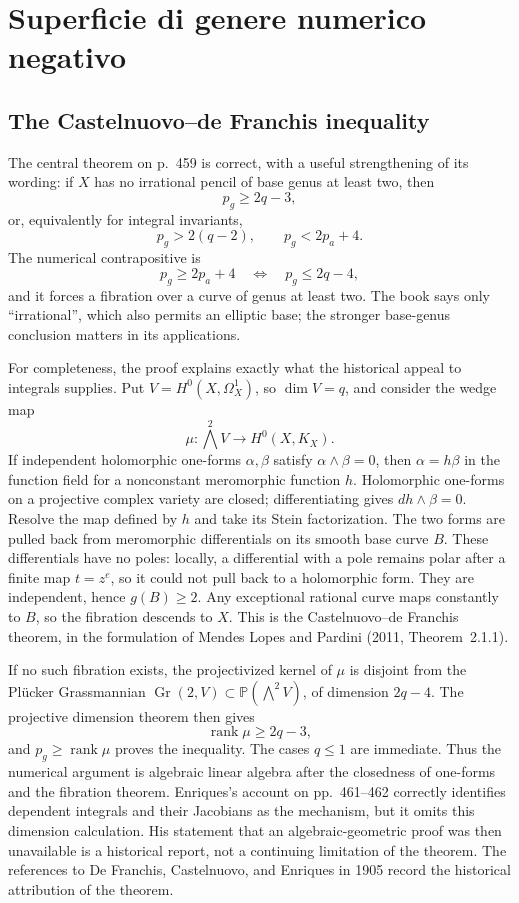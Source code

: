 \section{Superficie di genere numerico negativo}
\label{cp2-xi-8}

\subsection{The Castelnuovo--de Franchis inequality}

The central theorem on p.~459 is correct, with a useful strengthening of its wording: if \(X\) has no irrational pencil of base genus at least two, then
\[
p_g\ge2q-3,
\]
or, equivalently for integral invariants,
\[
p_g>2(q-2),\qquad p_g<2p_a+4.
\]
The numerical contrapositive is
\[
p_g\ge2p_a+4\quad\Longleftrightarrow\quad p_g\le2q-4,
\]
and it forces a fibration over a curve of genus at least two. The book says only ``irrational'', which also permits an elliptic base; the stronger base-genus conclusion matters in its applications.

For completeness, the proof explains exactly what the historical appeal to integrals supplies. Put \(V=H^0(X,\Omega_X^1)\), so \(\dim V=q\), and consider the wedge map
\[
\mu:\bigwedge^2V\longrightarrow H^0(X,K_X).
\]
If independent holomorphic one-forms \(\alpha,\beta\) satisfy \(\alpha\wedge\beta=0\), then \(\alpha=h\beta\) in the function field for a nonconstant meromorphic function \(h\). Holomorphic one-forms on a projective complex variety are closed; differentiating gives \(dh\wedge\beta=0\). Resolve the map defined by \(h\) and take its Stein factorization. The two forms are pulled back from meromorphic differentials on its smooth base curve \(B\). These differentials have no poles: locally, a differential with a pole remains polar after a finite map \(t=z^e\), so it could not pull back to a holomorphic form. They are independent, hence \(g(B)\ge2\). Any exceptional rational curve maps constantly to \(B\), so the fibration descends to \(X\). This is the Castelnuovo--de Franchis theorem, in the formulation of Mendes Lopes and Pardini (2011, Theorem~2.1.1).

If no such fibration exists, the projectivized kernel of \(\mu\) is disjoint from the Pl\"ucker Grassmannian \(\operatorname{Gr}(2,V)\subset\mathbb P(\bigwedge^2V)\), of dimension \(2q-4\). The projective dimension theorem then gives
\[
\operatorname{rank}\mu\ge2q-3,
\]
and \(p_g\ge\operatorname{rank}\mu\) proves the inequality. The cases \(q\le1\) are immediate. Thus the numerical argument is algebraic linear algebra after the closedness of one-forms and the fibration theorem. Enriques's account on pp.~461--462 correctly identifies dependent integrals and their Jacobians as the mechanism, but it omits this dimension calculation. His statement that an algebraic-geometric proof was then unavailable is a historical report, not a continuing limitation of the theorem. The references to De Franchis, Castelnuovo, and Enriques in 1905 record the historical attribution of the theorem.

